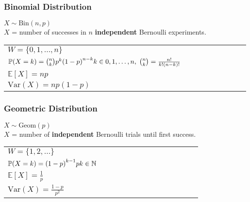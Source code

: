 \renewcommand{\arraystretch}{1}
\setlength\tabcolsep{\oldtabcolsep}



\subsubsection{Binomial Distribution}
$X \sim \mathrm{Bin}(n,p)$\\
$X$ = number of successes in $n$ \textbf{independent} Bernoulli experiments.

\renewcommand{\arraystretch}{1.3}
\setlength{\oldtabcolsep}{\tabcolsep}\setlength\tabcolsep{0pt}

\begin{tabularx}{\linewidth}{@{}p{0.5\linewidth}p{0.49\linewidth}@{}}
    $W=\{0,1,\ldots,n\}$                                                                                             &
    \multirow{4}{*}{
        \begin{minipage}{\linewidth}
            
        \end{minipage}
    }                                                                                                                  \\
    $\mathbb{P}(X=k)={n\choose k}p^k{(1-p)}^{n-k}\newline k\in {0,1,\ldots, n},\; {n\choose k}=\frac{n!}{k!(n-k)!} $ & \\
    $\mathbb{E}[X] = np$                                                                                             & \\
    $\mathrm{Var}(X) = np(1-p)$                                                                                      &
\end{tabularx}

\renewcommand{\arraystretch}{1}
\setlength\tabcolsep{\oldtabcolsep}

\subsubsection{Geometric Distribution}
$X \sim \mathrm{Geom}(p)$\\
$X$ = number of \textbf{independent} Bernoulli trials until first success.

\renewcommand{\arraystretch}{1.3}
\setlength{\oldtabcolsep}{\tabcolsep}\setlength\tabcolsep{3pt}

\begin{tabularx}{\linewidth}{@{}p{0.5\linewidth}p{0.49\linewidth}@{}}
    $W=\{1,2,\ldots\}$                                      &
    \multirow{4}{*}{
        
    }                                                         \\
    $\mathbb{P}(X=k)={(1-p)}^{k-1}p\newline k\in\mathbb{N}$ & \\
    $\mathbb{E}[X] = \frac{1}{p}$                           & \\
    $\mathrm{Var}(X) = \frac{1-p}{p^2}$
\end{tabularx}

